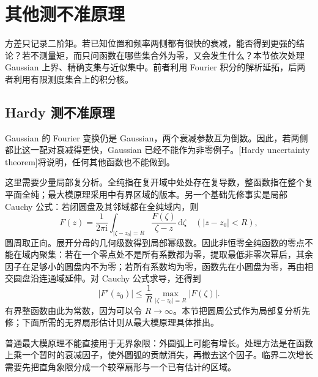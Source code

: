 \section{其他测不准原理}
\label{b2:sec:2003}

方差只记录二阶矩。若已知位置和频率两侧都有很快的衰减，能否得到更强的结论？若不测量矩，而只问函数在哪些集合外为零，又会发生什么？本节依次处理 Gaussian 上界、精确支集与近似集中。前者利用 Fourier 积分的解析延拓，后两者利用有限测度集合上的积分核。

\subsection{Hardy 测不准原理}
\label{b2:subsec:200301}

Gaussian 的 Fourier 变换仍是 Gaussian，两个衰减参数互为倒数。因此，若两侧都比这一配对衰减得更快，Gaussian 已经不能作为非零例子。[Hardy uncertainty theorem]将说明，任何其他函数也不能做到。

\ProseParagraphBreak

这里需要少量局部复分析。全纯指在复开域中处处存在复导数，整函数指在整个复平面全纯；最大模原理采用中有界区域的版本。另一个基础先修事实是局部 Cauchy 公式：若闭圆盘及其邻域都在全纯域内，则
\[
 F(z)=\frac1{2\pi\mathrm i}\int_{|\zeta-z_0|=R}
             \frac{F(\zeta)}{\zeta-z}\,\mathrm d\zeta
 \quad(|z-z_0|<R),
\]
圆周取正向。展开分母的几何级数得到局部幂级数。因此非恒零全纯函数的零点不能在域内聚集：若在一个零点处不是所有系数都为零，提取最低非零次幂后，其余因子在足够小的圆盘内不为零；若所有系数均为零，函数先在小圆盘为零，再由相交圆盘沿连通域延伸。对 Cauchy 公式求导，还得到
\[
 |F'(z_0)|\leq\frac1R\max_{|\zeta-z_0|=R}|F(\zeta)|.
\]
有界整函数由此为常数，因为可以令 \(R\to\infty\)。本节把圆周公式作为局部复分析先修；下面所需的无界扇形估计则从最大模原理具体推出。

\ProseParagraphBreak

普通最大模原理不能直接用于无界象限：外圆弧上可能有增长。处理方法是在函数上乘一个暂时的衰减因子，使外圆弧的贡献消失，再撤去这个因子。临界二次增长需要先把直角象限分成一个较窄扇形与一个已有估计的区域。

